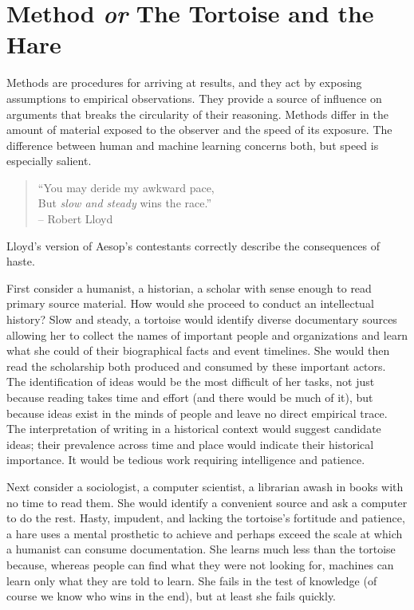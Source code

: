 \documentclass[]{book}
\begin{document}
\section{\texorpdfstring{Method \emph{or} The Tortoise and the
Hare}{Method or The Tortoise and the Hare}}\label{method-or-the-tortoise-and-the-hare}

Methods are procedures for arriving at results, and they act by exposing
assumptions to empirical observations. They provide a source of
influence on arguments that breaks the circularity of their reasoning.
Methods differ in the amount of material exposed to the observer and the
speed of its exposure. The difference between human and machine learning
concerns both, but speed is especially salient.

\begin{quote}
``You may deride my awkward pace,\\
But \emph{slow and steady} wins the race.''\\
-- Robert Lloyd \citeyearpar[38]{Lloyd1762Poems}
\end{quote}

Lloyd's version of Aesop's contestants correctly describe the
consequences of haste.

First consider a humanist, a historian, a scholar with sense enough to
read primary source material. How would she proceed to conduct an
intellectual history? Slow and steady, a tortoise would identify diverse
documentary sources allowing her to collect the names of important
people and organizations and learn what she could of their biographical
facts and event timelines. She would then read the scholarship both
produced and consumed by these important actors. The identification of
ideas would be the most difficult of her tasks, not just because reading
takes time and effort (and there would be much of it), but because ideas
exist in the minds of people and leave no direct empirical trace. The
interpretation of writing in a historical context would suggest
candidate ideas; their prevalence across time and place would indicate
their historical importance. It would be tedious work requiring
intelligence and patience.

Next consider a sociologist, a computer scientist, a librarian awash in
books with no time to read them. She would identify a convenient source
and ask a computer to do the rest. Hasty, impudent, and lacking the
tortoise's fortitude and patience, a hare uses a mental prosthetic to
achieve and perhaps exceed the scale at which a humanist can consume
documentation. She learns much less than the tortoise because, whereas
people can find what they were not looking for, machines can learn only
what they are told to learn. She fails in the test of knowledge (of
course we know who wins in the end), but at least she fails quickly.
\end{document}
